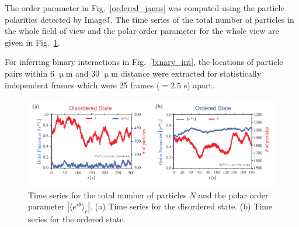 \documentclass[%
 reprint,
 amsmath,amssymb,
 aps,
 floatfix
]{revtex4-2}
\begin{document}
The order parameter in Fig.~\ref{ordered_janus} was computed using the particle polarities detected by ImageJ. The time series of the total number of particles in the whole field of view and the polar order parameter for the whole view are given in Fig.~\ref{timeseries}.

For inferring binary interactions in Fig.~\ref{binary_int}, the locations of particle pairs within 6 $\upmu$m and 30 $\upmu$m distance were extracted for statistically independent frames which were 25 frames ($=2.5$ s) apart.

\begin{figure}[hbt]
\includegraphics[width=0.88\columnwidth]{supp_time_series.pdf}
\caption{\label{timeseries} Time series for the total number of particles $N$ and the polar  order parameter $\left|\langle e^{i\theta}\rangle_r\right|$. (a) Time series for the disordered state. (b) Time series for the ordered state.}
\end{figure}
\end{document}
